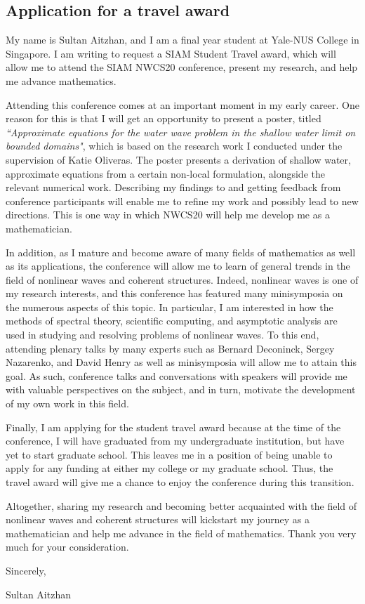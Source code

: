 \documentclass[10pt,reqno,oneside,a4paper]{article}
\author{Sultan Aitzhan}
\date{\today}
\begin{document}
\thispagestyle{fancy}

\subsection*{Application for a travel award}
My name is Sultan Aitzhan, and I am a final year student at Yale-NUS College in Singapore. I am writing to request a SIAM Student Travel award, which will allow me to attend the SIAM NWCS20 conference, present my research, and help me advance mathematics. 

Attending this conference comes at an important moment in my early career. One reason for this is that I will get an opportunity to present a poster, titled \textit{“Approximate equations for the water wave problem in the shallow water limit on bounded domains"}, which is based on the research work I conducted under the supervision of Katie Oliveras. The poster presents a derivation of shallow water, approximate equations from a certain non-local formulation, alongside the relevant numerical work. Describing my findings to and getting feedback from conference participants will enable me to refine my work and possibly lead to new directions. This is one way in which NWCS20 will help me develop me as a mathematician.

In addition, as I mature and become aware of many fields of mathematics as well as its applications, the conference will allow me to learn of general trends in the field of nonlinear waves and coherent structures. Indeed, nonlinear waves is one of my research interests, and this conference has featured many minisymposia on the numerous aspects of this topic. In particular, I am interested in how the methods of spectral theory, scientific computing, and asymptotic analysis are used in studying and resolving problems of nonlinear waves. To this end, attending plenary talks by many experts such as Bernard Deconinck, Sergey Nazarenko, and David Henry as well as minisymposia will allow me to attain this goal. As such, conference talks and conversations with speakers will provide me with valuable perspectives on the subject, and in turn, motivate the development of my own work in this field. 

Finally, I am applying for the student travel award because at the time of the conference, I will have graduated from my undergraduate institution, but have yet to start graduate school. This leaves me in a position of being unable to apply for any funding at either my college or my graduate school. Thus, the travel award will give me a chance to enjoy the conference during this transition. 

Altogether, sharing my research and becoming better acquainted with the field of nonlinear waves and coherent structures will kickstart my journey as a mathematician and help me advance in the field of mathematics. Thank you very much for your consideration.

Sincerely,

Sultan Aitzhan


{\small}
\end{document}
